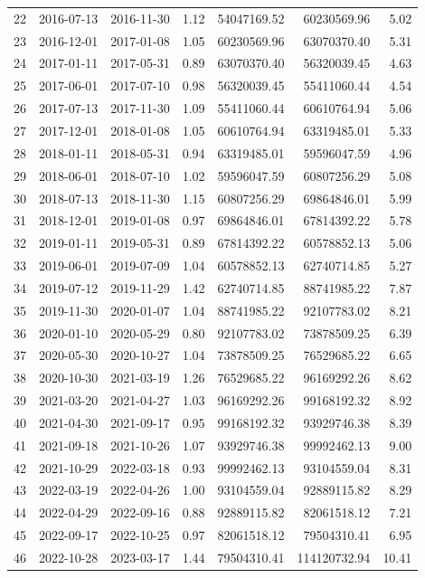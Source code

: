 \begin{appendices}
\begin{table}[H]
\begin{tabular}{rllrrrr}
  22 & 2016-07-13 & 2016-11-30 & 1.12 & 54047169.52 & 60230569.96 & 5.02 \\ 
  23 & 2016-12-01 & 2017-01-08 & 1.05 & 60230569.96 & 63070370.40 & 5.31 \\ 
  24 & 2017-01-11 & 2017-05-31 & 0.89 & 63070370.40 & 56320039.45 & 4.63 \\ 
  25 & 2017-06-01 & 2017-07-10 & 0.98 & 56320039.45 & 55411060.44 & 4.54 \\ 
  26 & 2017-07-13 & 2017-11-30 & 1.09 & 55411060.44 & 60610764.94 & 5.06 \\ 
  27 & 2017-12-01 & 2018-01-08 & 1.05 & 60610764.94 & 63319485.01 & 5.33 \\ 
  28 & 2018-01-11 & 2018-05-31 & 0.94 & 63319485.01 & 59596047.59 & 4.96 \\ 
  29 & 2018-06-01 & 2018-07-10 & 1.02 & 59596047.59 & 60807256.29 & 5.08 \\ 
  30 & 2018-07-13 & 2018-11-30 & 1.15 & 60807256.29 & 69864846.01 & 5.99 \\ 
  31 & 2018-12-01 & 2019-01-08 & 0.97 & 69864846.01 & 67814392.22 & 5.78 \\ 
  32 & 2019-01-11 & 2019-05-31 & 0.89 & 67814392.22 & 60578852.13 & 5.06 \\ 
  33 & 2019-06-01 & 2019-07-09 & 1.04 & 60578852.13 & 62740714.85 & 5.27 \\ 
  34 & 2019-07-12 & 2019-11-29 & 1.42 & 62740714.85 & 88741985.22 & 7.87 \\ 
  35 & 2019-11-30 & 2020-01-07 & 1.04 & 88741985.22 & 92107783.02 & 8.21 \\ 
  36 & 2020-01-10 & 2020-05-29 & 0.80 & 92107783.02 & 73878509.25 & 6.39 \\ 
  37 & 2020-05-30 & 2020-10-27 & 1.04 & 73878509.25 & 76529685.22 & 6.65 \\ 
  38 & 2020-10-30 & 2021-03-19 & 1.26 & 76529685.22 & 96169292.26 & 8.62 \\ 
  39 & 2021-03-20 & 2021-04-27 & 1.03 & 96169292.26 & 99168192.32 & 8.92 \\ 
  40 & 2021-04-30 & 2021-09-17 & 0.95 & 99168192.32 & 93929746.38 & 8.39 \\ 
  41 & 2021-09-18 & 2021-10-26 & 1.07 & 93929746.38 & 99992462.13 & 9.00 \\ 
  42 & 2021-10-29 & 2022-03-18 & 0.93 & 99992462.13 & 93104559.04 & 8.31 \\ 
  43 & 2022-03-19 & 2022-04-26 & 1.00 & 93104559.04 & 92889115.82 & 8.29 \\ 
  44 & 2022-04-29 & 2022-09-16 & 0.88 & 92889115.82 & 82061518.12 & 7.21 \\ 
  45 & 2022-09-17 & 2022-10-25 & 0.97 & 82061518.12 & 79504310.41 & 6.95 \\ 
  46 & 2022-10-28 & 2023-03-17 & 1.44 & 79504310.41 & 114120732.94 & 10.41 \\


\end{tabular}
\end{table}
\end{appendices}
